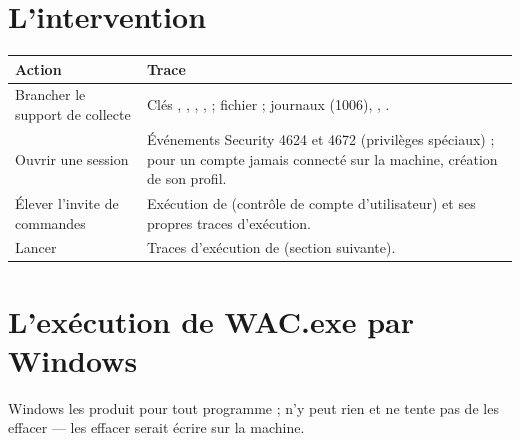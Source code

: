 \documentclass[11pt,a4paper,oneside]{report}
\begin{document}
\section{L'intervention}

\begin{longtable}{@{}L{4.3cm}L{10.1cm}@{}}
\toprule
\bfseries Action & \bfseries Trace \\
\midrule
\endhead
Brancher le support de collecte & Clés , ,
  , ,
   ; fichier  ; journaux
   (1006),
  , . \\
Ouvrir une session & Événements Security 4624 et 4672 (privilèges spéciaux) ;
  pour un compte jamais connecté sur la machine, création de son profil. \\
Élever l'invite de commandes & Exécution de  (contrôle de
  compte d'utilisateur) et ses propres traces d'exécution. \\
Lancer  & Traces d'exécution de 
  (section suivante). \\
\bottomrule
\end{longtable}

\section{L'exécution de WAC.exe par Windows}

Windows les produit pour tout programme ; \wac{} n'y peut rien et ne tente pas
de les effacer — les effacer serait écrire sur la machine.
\end{document}
